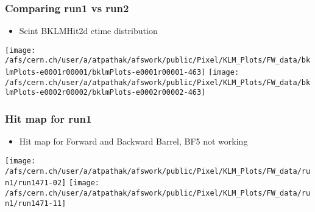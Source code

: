 \documentclass{beamer}
\begin{document}
\begin{frame}
\frametitle{Comparing run1 vs run2}
\vspace*{.05cm}

\begin{itemize} 
\item {\small Scint BKLMHit2d ctime distribution}
\end{itemize}

\begin{center}
\begin{normalsize}

\vspace*{-.2cm}
\begin{center}

\texttt{[image: /afs/cern.ch/user/a/atpathak/afswork/public/Pixel/KLM\_Plots/FW\_data/bklmPlots-e0001r00001/bklmPlots-e0001r00001-463]}
\texttt{[image: /afs/cern.ch/user/a/atpathak/afswork/public/Pixel/KLM\_Plots/FW\_data/bklmPlots-e0002r00002/bklmPlots-e0002r00002-463]} \\

\end{center}
\end{normalsize}
\end{center}
\end{frame}
\begin{frame}
\frametitle{Hit map for run1}
\vspace*{.05cm}

\begin{itemize} 
\item {\small Hit map for Forward and Backward Barrel, BF5 not working}
\end{itemize}

\begin{center}
\begin{normalsize}

\vspace*{-.2cm}
\begin{center}

\texttt{[image: /afs/cern.ch/user/a/atpathak/afswork/public/Pixel/KLM\_Plots/FW\_data/run1/run1471-02]}
\texttt{[image: /afs/cern.ch/user/a/atpathak/afswork/public/Pixel/KLM\_Plots/FW\_data/run1/run1471-11]} \\

\end{center}
\end{normalsize}
\end{center}
\end{frame}
\end{document}
